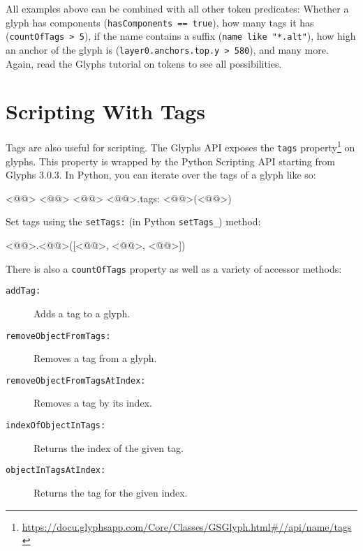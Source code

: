 All examples above can be combined with all other token predicates:
Whether a glyph has components (\texttt{hasComponents == true}),
how many tags it has (\texttt{countOfTags > 5}),
if the name contains a suffix (\texttt{name like "*.alt"}),
how high an anchor of the glyph is (\texttt{layer0.anchors.top.y > 580}),
and many more.
Again, read the Glyphs tutorial on tokens to see all possibilities.

\section{Scripting With Tags}%
\label{sec:scripting_with_tags}

Tags are also useful for scripting.
The Glyphs API exposes the \texttt{tags} property\footnote{\url{https://docu.glyphsapp.com/Core/Classes/GSGlyph.html\#//api/name/tags}} on glyphs.
This property is wrapped by the Python Scripting API starting from Glyphs 3.0.3.
In Python, you can iterate over the tags of a glyph like so:

\begin{RichListing}
<@@> <@@> <@@> <@@>.tags:
    <@@>(<@@>)
\end{RichListing}

\medbreak\noindent{}

\bigbreak\noindent Set tags using the \texttt{setTags:} (in Python \texttt{setTags\_}) method:

\begin{RichListing}
<@@>.<@@>([<@@>, <@@>, <@@>])
\end{RichListing}

\noindent There is also a \texttt{countOfTags} property as well as a variety of accessor methods:

\begin{description}
  \item[\texttt{addTag:}]
    Adds a tag to a glyph.
  
  \item[\texttt{removeObjectFromTags:}]
    Removes a tag from a glyph.
  
  \item[\texttt{removeObjectFromTagsAtIndex:}]
    Removes a tag by its index.
  
  \item[\texttt{indexOfObjectInTags:}]
    Returns the index of the given tag.
  
  \item[\texttt{objectInTagsAtIndex:}]
    Returns the tag for the given index.
\end{description}

